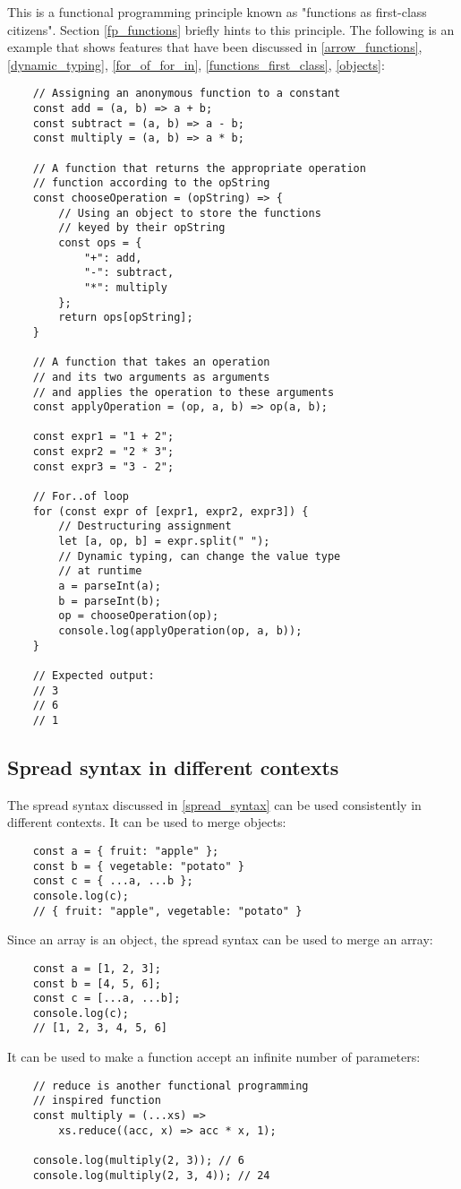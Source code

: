 \documentclass[11pt,a4paper]{article}
\begin{document}
This is a functional programming principle known as "functions as first-class citizens".
Section \ref{fp_functions} briefly hints to this principle.
The following is an example that shows features that have been discussed in
\ref{arrow_functions}, \ref{dynamic_typing}, \ref{for_of_for_in}, \ref{functions_first_class}, \ref{objects}:
\begin{verbatim}
    // Assigning an anonymous function to a constant
    const add = (a, b) => a + b;
    const subtract = (a, b) => a - b;
    const multiply = (a, b) => a * b;

    // A function that returns the appropriate operation
    // function according to the opString
    const chooseOperation = (opString) => {
        // Using an object to store the functions
        // keyed by their opString
        const ops = {
            "+": add,
            "-": subtract,
            "*": multiply
        };
        return ops[opString];
    }

    // A function that takes an operation
    // and its two arguments as arguments
    // and applies the operation to these arguments
    const applyOperation = (op, a, b) => op(a, b);

    const expr1 = "1 + 2";
    const expr2 = "2 * 3";
    const expr3 = "3 - 2";

    // For..of loop
    for (const expr of [expr1, expr2, expr3]) {
        // Destructuring assignment
        let [a, op, b] = expr.split(" ");
        // Dynamic typing, can change the value type
        // at runtime
        a = parseInt(a);
        b = parseInt(b);
        op = chooseOperation(op);
        console.log(applyOperation(op, a, b));
    }

    // Expected output:
    // 3
    // 6
    // 1
\end{verbatim}

\subsection{Spread syntax in different contexts}
The spread syntax discussed in \ref{spread_syntax} can be used consistently in different contexts.
It can be used to merge objects:
\begin{verbatim}
    const a = { fruit: "apple" };
    const b = { vegetable: "potato" }
    const c = { ...a, ...b };
    console.log(c);
    // { fruit: "apple", vegetable: "potato" }
\end{verbatim}
Since an array is an object, the spread syntax can be used to merge an array:
\begin{verbatim}
    const a = [1, 2, 3];
    const b = [4, 5, 6];
    const c = [...a, ...b];
    console.log(c);
    // [1, 2, 3, 4, 5, 6]
\end{verbatim}
It can be used to make a function accept an infinite number of parameters:
\begin{verbatim}
    // reduce is another functional programming
    // inspired function
    const multiply = (...xs) =>
        xs.reduce((acc, x) => acc * x, 1);

    console.log(multiply(2, 3)); // 6
    console.log(multiply(2, 3, 4)); // 24
\end{verbatim}
\end{document}

